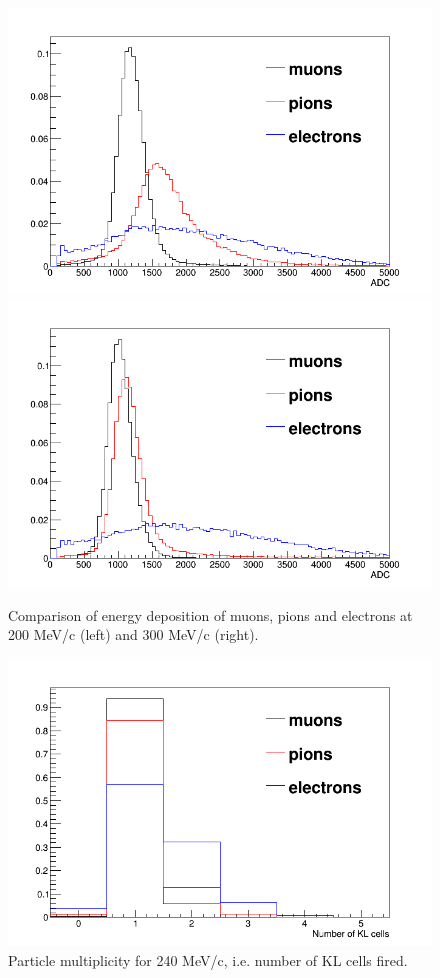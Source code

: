    \begin{figure}
   	\begin{center}
   		\includegraphics[width=0.4\columnwidth]{./04-KL/Figures/mu_vs_pi_vs_e_200MEV.png}  		\includegraphics[width=0.4\columnwidth]{./04-KL/Figures/mu_vs_pi_vs_e_300MEV.png}
   		\caption{Comparison of energy deposition of muons, pions and electrons at 200 MeV/c (left) and 300 MeV/c (right).}
   		\label{fig:KL_mu_to_pi}
   	\end{center}
   \end{figure}
    \begin{figure}
    	\begin{center}
    		\includegraphics[width=0.4\columnwidth]{./04-KL/Figures/multiplicity_240MEV.png}  		
    		\caption{Particle multiplicity for 240 MeV/c, i.e. number of KL cells fired.}
    		\label{fig:KL_mult}
    	\end{center}
    \end{figure}
       
